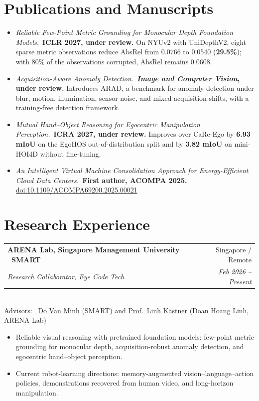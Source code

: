 \documentclass[letterpaper,11pt]{article}
\makeatletter
\newcommand{\role}[4]{%
  \Needspace{4\baselineskip}
  \vspace{4pt}
  \begin{tabular*}{\linewidth}{@{}l@{\extracolsep{\fill}}r@{}}
    \textbf{#1} & \textcolor{muted}{#2} \\[1pt]
    \textit{#3} & \textcolor{muted}{\textit{#4}} \\
  \end{tabular*}\\[1pt]
}
\newcommand{\advisors}[1]{%
  {\small\textcolor{muted}{Advisors:}\ #1}\par\vspace{1pt}
}
\newcommand{\paper}[2]{%
  \item \textit{#1}\ #2 \vspace{2pt}
}
\makeatother
\begin{document}
\section*{Publications and Manuscripts}

\begin{itemize}
  \paper
    {Reliable Few-Point Metric Grounding for Monocular Depth Foundation Models.}
    {\textbf{ICLR 2027, under review.}
    On NYUv2 with UniDepthV2, eight sparse metric observations reduce AbsRel
    from 0.0766 to 0.0540 (\textbf{29.5\%}); with 80\% of the observations
    corrupted, AbsRel remains 0.0608.}

  \paper
    {Acquisition-Aware Anomaly Detection.}
    {\textbf{\textit{Image and Computer Vision}, under review.}
    Introduces ARAD, a benchmark for anomaly detection under blur, motion,
    illumination, sensor noise, and mixed acquisition shifts, with a
    training-free detection framework.}

  \paper
    {Mutual Hand--Object Reasoning for Egocentric Manipulation Perception.}
    {\textbf{ICRA 2027, under review.}
    Improves over CaRe-Ego by \textbf{6.93 mIoU} on the EgoHOS
    out-of-distribution split and by \textbf{3.82 mIoU} on mini-HOI4D
    without fine-tuning.}

  \paper
    {An Intelligent Virtual Machine Consolidation Approach for Energy-Efficient Cloud Data Centers.}
    {\textbf{First author, ACOMPA 2025.}
    \href{https://doi.org/10.1109/ACOMPA69200.2025.00021}{doi:10.1109/ACOMPA69200.2025.00021}}
\end{itemize}

\section*{Research Experience}

\role
  {ARENA Lab, Singapore Management University \textbar\ SMART}
  {Singapore / Remote}
  {Research Collaborator, Eye Code Tech}
  {Feb 2026 -- Present}
\advisors{%
  \href{https://minhdov.github.io/}{Do Van Minh} (SMART)
  and
  \href{https://linhdoan.io/}{Prof.\ Linh K{\"a}stner} (Doan Hoang Linh, ARENA Lab)%
}

\begin{itemize}
  \item Reliable visual reasoning with pretrained foundation models: few-point metric grounding for monocular depth, acquisition-robust anomaly detection, and egocentric hand--object perception.
  \item Current robot-learning directions: memory-augmented vision--language--action policies, demonstrations recovered from human video, and long-horizon manipulation.
\end{itemize}
\end{document}
